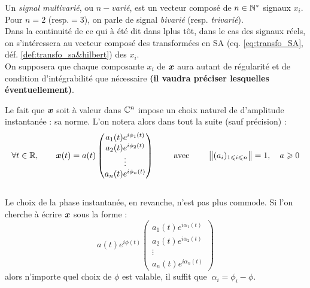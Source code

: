 \begin{definition}\label{def:signal_multivar}
	Un \emph{signal multivarié}, ou \emph{$n-$varié}, est un vecteur composé de $n\in\N^*$ signaux $x_i$. Pour $n=2$ (resp.$=3$), on parle de signal \emph{bivarié} (resp. \emph{trivarié}).
	\\
	Dans la continuité de ce qui à été dit dans lplus tôt, dans le cas des signaux réels, on s'intéressera au vecteur composé des transformées en SA (eq. \eqref{eq:transfo_SA}, déf. \ref{def:transfo_sa&hilbert}) des $x_i$.
	\\
	On supposera que chaque composante $x_i$ de $\bf{x}$ aura autant de régularité et de condition d'intégrabilité que nécessaire \textbf{(il vaudra préciser lesquelles éventuellement)}.
\end{definition}

Le fait que $\bf{x}$ soit à valeur dans $\C^n$ impose un choix naturel de d'amplitude instantanée : sa norme. L'on notera alors dans tout la suite (sauf précision) :
\[\forall t\in\R,\qquad 
\bf{x}(t) = a(t)\begin{pmatrix} a_1(t)e^{i\phi_1(t)} \\ a_2(t)e^{i\phi_2(t)} \\ \vdots \\ a_n(t)e^{i\phi_n(t)}
\end{pmatrix} \qquad\text{ avec }\qquad \big\|(a_i)_{1\leq i\leq n}\big\|=1,\quad a\geq 0
\]
\\
Le choix de la phase instantanée, en revanche, n'est pas plus commode. Si l'on cherche à écrire $\bf{x}$ sous la forme :
\[a(t)e^{i\phi(t)}\begin{pmatrix} a_1(t)e^{i\alpha_1(t)} \\ a_2(t)e^{i\alpha_2(t)} \\ \vdots \\ a_n(t)e^{i\alpha_n(t)}
\end{pmatrix}\]
alors n'importe quel choix de $\phi$ est valable, il suffit que $\ \alpha_i = \phi_i-\phi$.
\\



